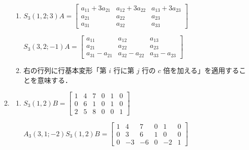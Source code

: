 \documentclass[11pt, uplatex, dvipdfmx]{jsarticle}
\begin{document}
\begin{enumerate}
\begin{enumerate}[(1)]
  \item $S_3(1,2;3)A=\left[
      \begin{array}{ccc}
        a_{11}+3a_{21} & a_{12}+3a_{22} & a_{13}+3a_{23}\\
        a_{21} & a_{22} & a_{23}\\
        a_{31} & a_{32} & a_{33}
      \end{array}
    \right]$ \vspace{1ex}

    $S_3(3,2;-1)A=\left[
      \begin{array}{ccc}
        a_{11} & a_{12} & a_{13}\\
        a_{21} & a_{22} & a_{23}\\
        a_{31}-a_{21} & a_{32} -a_{22} & a_{33}-a_{23}
      \end{array}
    \right]$
    
  \item 右の行列に行基本変形「第 $i$ 行に第 $j$ 行の $c$ 倍を加える」を適用することを意味する．
  \end{enumerate}

\item
  \begin{enumerate}[(1)]
    \setlength{\itemsep}{1ex}
    
  \item   $S_3(1,2)B=\left[
    \begin{array}{rrrrrr}
      1 & 4 & 7 & 0 & 1 & 0\\
      0 & 6 & 1 & 0 & 1 & 0\\
      2 & 5 & 8 & 0 & 0 & 1
    \end{array}
  \right]$ \vspace{1ex}

  $A_3(3,1;-2) S_3(1,2)B = \left[
    \begin{array}{rrrrrr}
      1 & 4 & 7 & 0 & 1 & 0\\
      0 & 3 & 6 & 1 & 0 & 0\\
      0 & -3 & -6 & 0 & -2 & 1
    \end{array}
  \right]$



\end{enumerate}
\end{enumerate}
\end{document}
